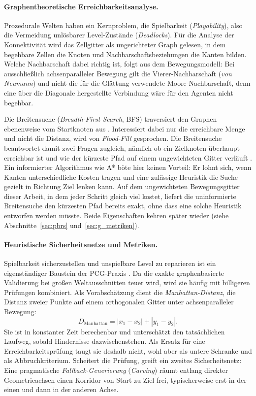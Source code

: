 \documentclass[11pt,a4paper]{article}
\begin{document}
\paragraph{Graphentheoretische Erreichbarkeitsanalyse.}
Prozedurale Welten haben ein Kernproblem, die Spielbarkeit
(\emph{Playability}), also die Vermeidung unlösbarer Level-Zustände
(\emph{Deadlocks}). Für die Analyse der Konnektivität wird das Zellgitter als
ungerichteter Graph gelesen, in dem begehbare Zellen die Knoten und
Nachbarschaftsbeziehungen die Kanten bilden. Welche Nachbarschaft dabei richtig
ist, folgt aus dem Bewegungsmodell: Bei ausschließlich achsenparalleler Bewegung
gilt die Vierer-Nachbarschaft (\emph{von Neumann}) und nicht die für die
Glättung verwendete Moore-Nachbarschaft, denn eine über die Diagonale
hergestellte Verbindung wäre für den Agenten nicht begehbar.

Die Breitensuche (\emph{Breadth-First Search}, BFS) traversiert den Graphen
ebenenweise vom Startknoten aus \cite{cormen2009algorithms}. Interessiert dabei
nur die erreichbare Menge und nicht die Distanz, wird von \emph{Flood-Fill}
gesprochen. Die Breitensuche beantwortet damit zwei Fragen zugleich, nämlich ob
ein Zielknoten überhaupt erreichbar ist und wie der kürzeste Pfad auf einem
ungewichteten Gitter verläuft \cite{cormen2009algorithms}. Ein informierter
Algorithmus wie A* \cite{hart1968astar} böte hier keinen Vorteil: Er lohnt
sich, wenn Kanten unterschiedliche Kosten tragen und eine zulässige
Heuristik die Suche gezielt in Richtung Ziel lenken kann. Auf dem
ungewichteten Bewegungsgitter dieser Arbeit, in dem jeder Schritt gleich
viel kostet, liefert die uninformierte Breitensuche den kürzesten Pfad
bereits exakt, ohne dass eine solche Heuristik entworfen werden müsste. Beide
Eigenschaften kehren später wieder (siehe Abschnitte~\ref{sec:pbrs}
und~\ref{sec:g_metriken}).

\paragraph{Heuristische Sicherheitsnetze und Metriken.}
Spielbarkeit sicherzustellen und unspielbare Level zu reparieren ist ein
eigenständiger Baustein der PCG-Praxis \cite{shaker2016pcg}. Da die exakte
graphenbasierte Validierung bei großen Weltausschnitten teuer wird, wird sie
häufig mit billigeren Prüfungen kombiniert. Als Vorabschätzung dient die
\emph{Manhattan-Distanz}, die Distanz zweier Punkte auf einem orthogonalen
Gitter unter achsenparalleler Bewegung:
\begin{equation}
D_{\mathrm{Manhattan}} = |x_1 - x_2| + |y_1 - y_2|.
\end{equation}
Sie ist in konstanter Zeit berechenbar und unterschätzt den tatsächlichen
Laufweg, sobald Hindernisse dazwischenstehen. Als Ersatz für eine
Erreichbarkeitsprüfung taugt sie deshalb nicht, wohl aber als untere Schranke
und als Abbruchkriterium. Scheitert die Prüfung, greift ein zweites
Sicherheitsnetz: Eine pragmatische \emph{Fallback-Generierung} (\emph{Carving})
räumt entlang direkter Geometrieachsen einen Korridor von Start zu Ziel frei,
typischerweise erst in der einen und dann in der anderen Achse.
\end{document}

